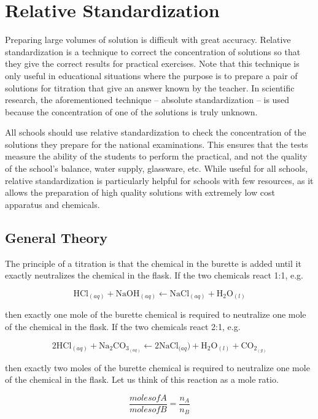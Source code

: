 \chapter{Relative Standardization}

Preparing large volumes of solution is difficult with great accuracy. Relative standardization is a technique to correct the concentration of solutions so that they give the correct results for practical exercises. Note that this technique is only useful in educational situations where the purpose is to prepare a pair of solutions for titration that give an answer known by the teacher. In scientific research, the aforementioned technique – absolute standardization – is used because the concentration of one of the solutions is truly unknown.

All schools should use relative standardization to check the concentration of the solutions they prepare for the national examinations. This ensures that the tests measure the ability of the students to perform the practical, and not the quality of the school's balance, water supply, glassware, etc. While useful for all schools, relative standardization is particularly helpful for schools with few resources, as it allows the preparation of high quality solutions with extremely low cost apparatus and chemicals.

\section{General Theory}

The principle of a titration is that the chemical in the burette is added until it exactly neutralizes the chemical in the flask. If the two chemicals react 1:1, e.g. 

\[ \mathrm{HCl}_{(aq)} + \mathrm{NaOH}_{(aq)} \longleftarrow \mathrm{NaCl}_{(aq)} + \mathrm{H}_2\mathrm{O}_{(l)} \]

then exactly one mole of the burette chemical is required to neutralize one mole of the chemical in the flask. If the two chemicals react 2:1, e.g. 

\[ 2\mathrm{HCl}_{(aq)} + \mathrm{Na}_2\mathrm{CO}_{3}_{(aq)} \longleftarrow 2\mathrm{NaCl}_{(aq}) + \mathrm{H}_2\mathrm{O}_{(l)} + \mathrm{CO}_2_{(g)} \]

then exactly two moles of the burette chemical is required to neutralize one mole of the chemical in the flask. Let us think of this reaction as a mole ratio.

\[ \frac{moles of A}{moles of B} = \frac{n_{A}}{n_{B}} \]

